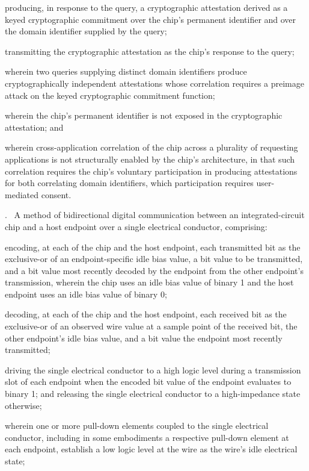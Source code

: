 \documentclass[12pt,letterpaper]{article}
\newcounter{claim}
\newcommand{\claim}[1]{\medskip\par\refstepcounter{claim}\noindent\arabic{claim}.~\label{clm:#1}\ignorespaces}
\begin{document}
producing, in response to the query, a cryptographic attestation derived as a keyed cryptographic commitment over the chip's permanent identifier and over the domain identifier supplied by the query;

transmitting the cryptographic attestation as the chip's response to the query;

wherein two queries supplying distinct domain identifiers produce cryptographically independent attestations whose correlation requires a preimage attack on the keyed cryptographic commitment function;

wherein the chip's permanent identifier is not exposed in the cryptographic attestation; and

wherein cross-application correlation of the chip across a plurality of requesting applications is not structurally enabled by the chip's architecture, in that such correlation requires the chip's voluntary participation in producing attestations for both correlating domain identifiers, which participation requires user-mediated consent.

\claim{linecode} A method of bidirectional digital communication between an integrated-circuit chip and a host endpoint over a single electrical conductor, comprising:

encoding, at each of the chip and the host endpoint, each transmitted bit as the exclusive-or of an endpoint-specific idle bias value, a bit value to be transmitted, and a bit value most recently decoded by the endpoint from the other endpoint's transmission, wherein the chip uses an idle bias value of binary 1 and the host endpoint uses an idle bias value of binary 0;

decoding, at each of the chip and the host endpoint, each received bit as the exclusive-or of an observed wire value at a sample point of the received bit, the other endpoint's idle bias value, and a bit value the endpoint most recently transmitted;

driving the single electrical conductor to a high logic level during a transmission slot of each endpoint when the encoded bit value of the endpoint evaluates to binary 1; and releasing the single electrical conductor to a high-impedance state otherwise;

wherein one or more pull-down elements coupled to the single electrical conductor, including in some embodiments a respective pull-down element at each endpoint, establish a low logic level at the wire as the wire's idle electrical state;
\end{document}

